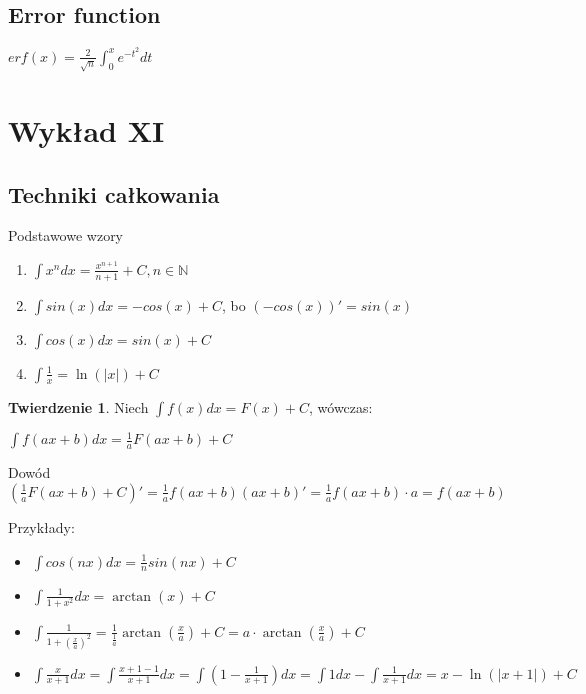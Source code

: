 \documentclass{article}
\theoremstyle{definition}
\theoremstyle{definition}
\newtheorem{tw}{Twierdzenie}[subsection]
\theoremstyle{definition}
\theoremstyle{definition}
\begin{document}
\subsection{Error function}

\begin{center}
    $erf(x)=\frac{2}{\sqrt{n}} \int_{0}^{x} e^{-t^2} dt$
\end{center}

\section{Wykład XI}

\subsection{Techniki całkowania}

Podstawowe wzory
\begin{enumerate}
    \item $\int x^n dx = \frac{x^{n+1}}{n+1} + C, n\in \mathbb{N}$
    \item $\int sin(x) dx = - cos(x) + C$, bo $(-cos(x))'=sin(x)$
    \item $\int cos(x) dx = sin (x) + C$
    \item $\int \frac{1}{x} = \ln(|x|) + C$
\end{enumerate}

\begin{tw}
    Niech $\int f(x) dx = F(x) + C$, wówczas:
    \begin{center}
        $\int f(ax+b) dx = \frac{1}{a}F(ax+b)+C$
    \end{center}
    Dowód\\
    $\left(\frac{1}{a}F(ax+b)+C\right)'=\frac{1}{a} f(ax+b) (ax+b)' = \frac{1}{a} f(ax+b)\cdot a = f(ax+b)$
\end{tw}
Przykłady:
\begin{itemize}
    \item $\int cos(nx) dx = \frac{1}{n} sin(nx) + C$
    \item $\int \frac{1}{1+x^2} dx = \arctan(x) + C$
    \item $\int \frac{1}{1+(\frac{x}{a})^2} = \frac{1}{\frac{1}{a}} \arctan(\frac{x}{a}) + C = a\cdot \arctan(\frac{x}{a}) + C$
    \item $\int \frac{x}{x+1} dx = \int \frac{x+1-1}{x+1} dx = \int (1-\frac{1}{x+1}) dx = \int 1 dx - \int \frac{1}{x+1} dx = x - \ln(|x+1|) + C$
\end{itemize}
\end{document}
